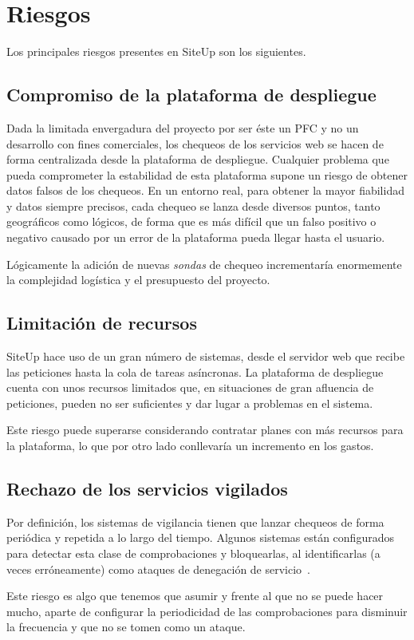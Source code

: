 \section{Riesgos}

\label{sec:riesgos}

Los principales riesgos presentes en SiteUp son los siguientes.

\subsection{Compromiso de la plataforma de despliegue}
\label{subsec:riesgo-compromiso-plataforma}

Dada la limitada envergadura del proyecto por ser éste un PFC y no un desarrollo
con fines comerciales, los chequeos de los servicios web se hacen de forma
centralizada desde la plataforma de despliegue. Cualquier problema que pueda
comprometer la estabilidad de esta plataforma supone un riesgo de obtener datos
falsos de los chequeos. En un entorno real, para obtener la mayor fiabilidad y
datos siempre precisos, cada chequeo se lanza desde diversos puntos, tanto
geográficos como lógicos, de forma que es más difícil que un falso positivo o
negativo causado por un error de la plataforma pueda llegar hasta el usuario.

Lógicamente la adición de nuevas \textit{sondas} de chequeo incrementaría
enormemente la complejidad logística y el presupuesto del proyecto.

\subsection{Limitación de recursos}

SiteUp hace uso de un gran número de sistemas, desde el servidor web que recibe
las peticiones hasta la cola de tareas asíncronas. La plataforma de despliegue
cuenta con unos recursos limitados que, en situaciones de gran afluencia de
peticiones, pueden no ser suficientes y dar lugar a problemas en el
sistema. 

Este riesgo puede superarse considerando contratar planes con más recursos para
la plataforma, lo que por otro lado conllevaría un incremento en los gastos.

\subsection{Rechazo de los servicios vigilados}

Por definición, los sistemas de vigilancia tienen que lanzar chequeos de forma
periódica y repetida a lo largo del tiempo. Algunos sistemas están configurados
para detectar esta clase de comprobaciones y bloquearlas, al identificarlas (a
veces erróneamente) como ataques de denegación de servicio~\cite{ddos}. 

Este riesgo es algo que tenemos que asumir y frente al que no se puede hacer
mucho, aparte de configurar la periodicidad de las comprobaciones para
disminuir la frecuencia y que no se tomen como un ataque.



